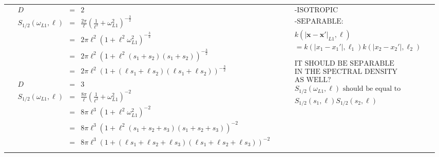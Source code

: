 \documentclass[onecolumn,a4paper,11pt]{article}
\begin{document}
\begin{landscape}
\begin{table}[H]
\begin{center}
\begin{tabular}{|c|c|c|c|}
       & \multicolumn{1}{|p{9.7cm}|}{\small
         \begin{eqnarray*}
		D &=& 2\\
		S_{1/2}(\omega_{L1},\ell) &=& \frac{2\pi}{\ell}\left(\frac{1}{\ell^2}+\omega_{L1}^2 \right)^{-\frac{3}{2}} \\
		&=& 2\pi\ell^2\left(1+\ell^2\omega_{L1}^2\right)^{-\frac{3}{2}} \\
		&=& 2\pi\ell^2\left(1+\ell^2(s_{1}+s_{2})(s_{1}+s_{2})\right)^{-\frac{3}{2}} \\
		&=& 2\pi\ell^2\left(1+(\ell s_{1}+\ell s_{2})(\ell s_{1}+\ell s_{2})\right)^{-\frac{3}{2}} \\
		\\
		D &=& 3\\
		S_{1/2}(\omega_{L1},\ell) &=& \frac{8\pi}{\ell}\left(\frac{1}{\ell^2}+\omega_{L1}^2 \right)^{-2} \\
		&=& 8\pi\ell^3\left(1+\ell^2\omega_{L1}^2\right)^{-2} \\
		&=& 8\pi\ell^3\left(1+\ell^2(s_{1}+s_{2}+s_{3})(s_{1}+s_{2}+s_{3})\right)^{-2} \\
		&=& 8\pi\ell^3\left(1+(\ell s_{1}+\ell s_{2}+\ell s_{3})(\ell s_{1}+\ell s_{2}+\ell s_{3})\right)^{-2} 
         \end{eqnarray*}
       }
       
       & \multicolumn{1}{|p{5.7cm}|}{\small
         \begin{eqnarray*}
        &&\text{-ISOTROPIC}\\
        \\
		&&\text{-SEPARABLE:} \\
		\\
		&&k(|\bm{x}-\bm{x}'|_{L1},\bm{\ell})\\
		 &&= k(|x_1-x_1'|,\ell_1)k(|x_2-x_2'|,\ell_2)\\
		 \\
		 \\
		 &&\text{IT SHOULD BE SEPARABLE}\\
		 &&\text{IN THE SPECTRAL DENSITY} \\
		 &&\text{AS WELL?}\\
		&&S_{1/2}(\omega_{L1},\ell) \text{ should be equal to }\\
		 &&S_{1/2}(s_1,\ell)S_{1/2}(s_2,\ell)
         \end{eqnarray*}
       }\\
       \vspace{-10mm}\\
        \cline{1-3}
         

\end{tabular}
\end{center}
\end{table}
\end{landscape}
\end{document}
